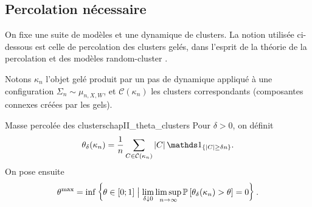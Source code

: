\subsection{Percolation nécessaire}

On fixe une suite de modèles et une dynamique de clusters. La notion utilisée ci-dessous est celle de percolation des clusters gelés, dans l'esprit de la théorie de la percolation et des modèles random-cluster \cite{BroadbentHammersley,Grimmett1999,Grimmett2006}. 

Notons $\kappa_n$ l'objet gelé produit par un pas de dynamique appliqué à une configuration $\Sigma_n\sim\mu_{n,X,W}$, et $\mathcal C(\kappa_n)$ les clusters correspondants (composantes connexes créées par les gels).

\begin{Definition}{Masse percolée des clusters}{chapII_theta_clusters}
Pour $\delta>0$, on définit
\begin{equation}
    \theta_\delta(\kappa_n)
    =
    \frac1n\sum_{C\in\mathcal C(\kappa_n)}|C|\,\ind{|C|\ge \delta n}.
    \label{eq:chapII_theta_delta}
\end{equation}
On pose ensuite
\begin{equation}
    \theta^{\max}
    =
    \inf\left\{\theta\in[0 ; 1] \bigm| 
    \lim_{\delta\downarrow0}\limsup_{n\to\infty}
    \mathbb P\left[\theta_\delta(\kappa_n)>\theta\right]=0
    \right\}.
    \label{eq:chapII_theta_max}
\end{equation}
\end{Definition}



